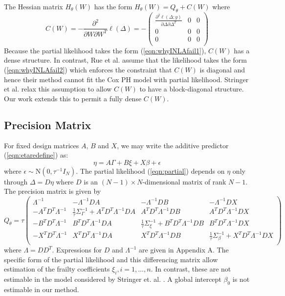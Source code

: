 \documentclass[AMA,STIX1COL,doublespace]{WileyNJD-v2}
\begin{document}
The Hessian matrix $H_{\theta}(W)$ has the form $H_{\theta}(W) = Q_{\theta} + C(W)$ where
\begin{equation*}
C(W) = -\frac{\partial^{2}}{\partial W\partial W^{T}}\ell(\Delta) = -\begin{pmatrix}
\frac{\partial^{2}\ell(\Delta;y)}{\partial\Delta\partial\Delta^{T}} & 0 & 0 \\
0 & 0 & 0 \\
0 & 0 & 0 \\
\end{pmatrix}
\end{equation*}
Because the partial likelihood takes the form (\ref{eqn:whyINLAfail1}), $C(W)$ has a dense structure. In contrast, Rue et al. \cite{inla} assume that the likelihood takes the form (\ref{eqn:whyINLAfail2}) which enforces the constraint that $C(W)$ is diagonal and hence their method cannot fit the Cox PH model with partial likelihood. Stringer et al. \cite{casecross} relax this assumption to allow $C(W)$ to have a block-diagonal structure. Our work extends this to permit a fully dense $C(W)$. 

\subsection{Precision Matrix}\label{subsec:Q} 

For fixed design matrices $A$, $B$ and $X$, we may write the additive predictor (\ref{eqn:etaredefine}) as:
\begin{equation}
\eta = A\Gamma + B\xi + X\beta + \epsilon
\end{equation}
where $\epsilon \sim \text{N}\left( 0,\tau^{-1}I_{N}\right)$. The partial likelihood (\ref{eqn:partial}) depends on $\eta$ only through $\Delta = D\eta$ where $D$ is an $(N -1) \times N $-dimensional matrix of rank $N -1$. The precision matrix is given by
\begin{equation}\label{eqn:precmat}
Q_{\theta} = \tau\begin{pmatrix}
\Lambda^{-1} & -\Lambda^{-1}DA & -\Lambda^{-1}DB & - \Lambda^{-1}DX \\
- A^{T}D^{T}\Lambda^{-1} & \frac{1}{\tau}\Sigma_{\Gamma}^{-1} +  A^{T}D^{T}\Lambda^{-1}DA &  A^{T}D^{T}\Lambda^{-1}DB &  A^{T}D^{T}\Lambda^{-1}DX \\
- B^{T}D^{T}\Lambda^{-1} &  B^{T}D^{T}\Lambda^{-1}DA & \frac{1}{\tau}\Sigma_{\xi}^{-1} +  B^{T}D^{T}\Lambda^{-1}DB & B^{T}D^{T}\Lambda^{-1}DX \\
- X^{T}D^{T}\Lambda^{-1} &  X^{T}D^{T}\Lambda^{-1}DA & X^{T}D^{T}\Lambda^{-1}DB & \frac{1}{\tau}\Sigma_{\beta}^{-1} +  X^{T}D^{T}\Lambda^{-1}DX \\
\end{pmatrix}
\end{equation}
where $\Lambda = DD^{T}$. Expressions for $D$ and $\Lambda^{-1}$ are given in Appendix A. The specific form of the partial likelihood and this differencing matrix allow estimation of the frailty coefficients $\xi_{i},i = 1,\ldots,n$. In contrast, these are not estimable in the model considered by Stringer et. al. \cite{casecross}. A global intercept $\beta_{0}$ is not estimable in our method.
\end{document}
